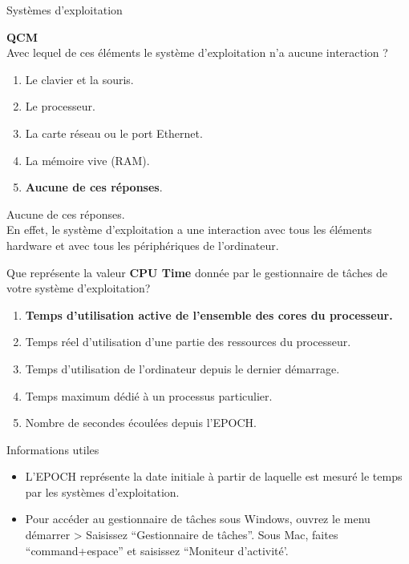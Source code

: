 \begin{section}{Systèmes d'exploitation}
    \begin{Exercice}[5 minutes]  \textbf{QCM}\\
    Avec lequel de ces éléments le système d'exploitation n'a aucune interaction ?
        \begin{enumerate}
            \item Le clavier et la souris.
            \item Le processeur.
            \item La carte réseau ou le port Ethernet.
            \item La mémoire vive (RAM).
            \item \textbf{Aucune de ces réponses}.
        \end{enumerate}
    \end{Exercice}
    \begin{solution}
            Aucune de ces réponses. \\
	    
	    En effet, le système d'exploitation a une interaction avec tous les éléments hardware et avec tous les périphériques de l'ordinateur. \\
    \end{solution}

    \begin{Exercice}[5 minutes]
        Que représente la valeur \textbf{CPU Time} donnée par le gestionnaire de tâches de votre système d'exploitation?
        \begin{enumerate}
            \item \textbf{Temps d'utilisation active de l'ensemble des cores du processeur.}
            \item Temps réel d'utilisation d'une partie des ressources du processeur.
            \item Temps d'utilisation de l'ordinateur depuis le dernier démarrage.
            \item Temps maximum dédié à un processus particulier.
            \item Nombre de secondes écoulées depuis l'EPOCH.
        \end{enumerate}
        \begin{Example}{\faLightbulb \quad Informations utiles}
            \begin{itemize}
                \item L'EPOCH représente la date initiale à partir de laquelle est mesuré le temps par les systèmes d'exploitation.
                \item Pour accéder au gestionnaire de tâches sous Windows, ouvrez le menu démarrer > Saisissez ``Gestionnaire de tâches''. Sous Mac, faites ``command+espace'' et saisissez ``Moniteur d'activité'.
            \end{itemize}
            

\end{Example}
\end{Exercice}
\end{section}
